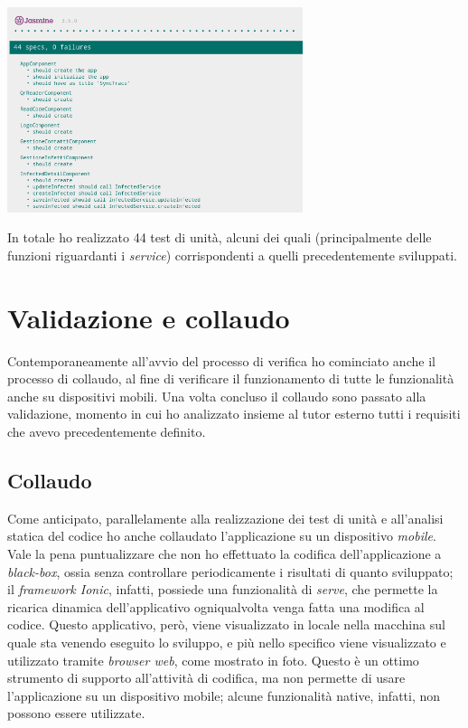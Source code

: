 \begin{minipage}{\linewidth}
  \centering
    \includegraphics[height=6cm]{immagini/jasminekarma}
\end{minipage}

In totale ho realizzato 44 test di unità, alcuni dei quali (principalmente delle funzioni riguardanti i \textit{service}) corrispondenti a quelli precedentemente sviluppati.


\section{Validazione e collaudo}

Contemporaneamente all'avvio del processo di verifica ho cominciato anche il processo di collaudo, al fine di verificare il funzionamento di tutte le funzionalità anche su dispositivi mobili. Una volta concluso il collaudo sono passato alla validazione, momento in cui ho analizzato insieme al tutor esterno tutti i requisiti che avevo precedentemente definito.

\subsection*{Collaudo}

Come anticipato, parallelamente alla realizzazione dei test di unità e all'analisi statica del codice ho anche collaudato l'applicazione su un dispositivo \textit{mobile}. Vale la pena puntualizzare che non ho effettuato la codifica dell'applicazione a \textit{black-box}, ossia senza controllare periodicamente i risultati di quanto sviluppato; il \textit{framework Ionic}, infatti, possiede una funzionalità di \textit{serve}, che permette la ricarica dinamica dell'applicativo ogniqualvolta venga fatta una modifica al codice. Questo applicativo, però, viene visualizzato in locale nella macchina sul quale sta venendo eseguito lo sviluppo, e più nello specifico viene visualizzato e utilizzato tramite \textit{browser web}, come mostrato in foto. Questo è un ottimo strumento di supporto all'attività di codifica, ma non permette di usare l'applicazione su un dispositivo mobile; alcune funzionalità native, infatti, non possono essere utilizzate. \\


